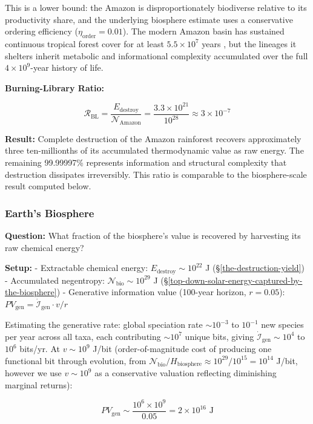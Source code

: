 \documentclass[11pt]{article}
\theoremstyle{plain}
\theoremstyle{definition}
\theoremstyle{remark}
\let\origsubsubsection\subsubsection
\renewcommand{\subsubsection}{\needspace{4\baselineskip}\origsubsubsection}
\begin{document}
This is a lower bound: the Amazon is disproportionately biodiverse
relative to its productivity share, and the underlying biosphere
estimate uses a conservative ordering efficiency
(\(\eta_{\text{order}} = 0.01\)). The modern Amazon basin has sustained
continuous tropical forest cover for at least \(5.5 \times 10^7\) years
\citep{Morley2000}, but the lineages it shelters inherit metabolic and
informational complexity accumulated over the full
\(4 \times 10^9\)-year history of life.

\textbf{Burning-Library Ratio:}

\[\mathcal{R}_{\text{BL}} = \frac{E_{\text{destroy}}}{\mathcal{N}_{\text{Amazon}}} = \frac{3.3 \times 10^{21}}{10^{28}} \approx 3 \times 10^{-7}\]

\textbf{Result:} Complete destruction of the Amazon rainforest recovers
approximately three ten-millionths of its accumulated thermodynamic
value as raw energy. The remaining 99.99997\% represents information and
structural complexity that destruction dissipates irreversibly. This
ratio is comparable to the biosphere-scale result computed below.

\subsubsection{Earth's Biosphere}\label{earths-biosphere}

\textbf{Question:} What fraction of the biosphere's value is recovered
by harvesting its raw chemical energy?

\textbf{Setup:} - Extractable chemical energy:
\(E_{\text{destroy}} \sim 10^{22}\) J (§\ref{the-destruction-yield}) -
Accumulated negentropy: \(\mathcal{N}_{\text{bio}} \sim 10^{29}\) J
(§\ref{top-down-solar-energy-captured-by-the-biosphere}) - Generative
information value (100-year horizon, \(r = 0.05\)):
\(PV_{\text{gen}} = \dot{\mathcal{I}}_{\text{gen}} \cdot v / r\)

Estimating the generative rate: global speciation rate \(\sim 10^{-3}\)
to \(10^{-1}\) new species per year across all taxa, each contributing
\(\sim 10^7\) unique bits, giving
\(\dot{\mathcal{I}}_{\text{gen}} \sim 10^4\) to \(10^6\) bits/yr. At
\(v \sim 10^9\) J/bit (order-of-magnitude cost of producing one
functional bit through evolution, from
\(\mathcal{N}_{\text{bio}} / H_{\text{biosphere}} \approx 10^{29}/10^{15} = 10^{14}\)
J/bit, however we use \(v \sim 10^9\) as a conservative valuation
reflecting diminishing marginal returns):

\[PV_{\text{gen}} \sim \frac{10^6 \times 10^9}{0.05} = 2 \times 10^{16} \text{ J}\]
\end{document}

